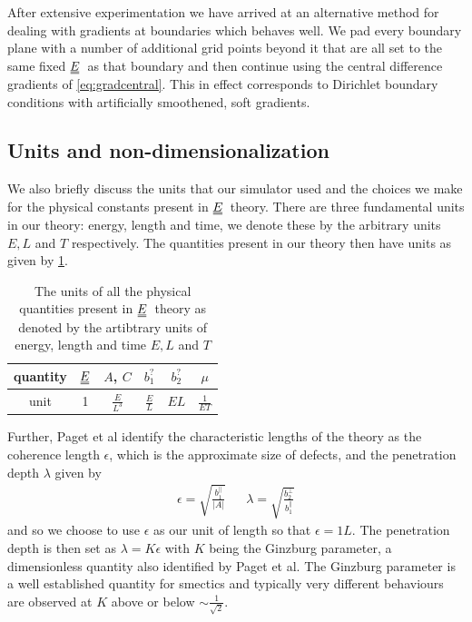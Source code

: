\documentclass[12pt]{article}
\newcommand{\duf}[2]{\stackunder[0.5pt]{\stackunder[0.8pt]{\stackunder[1pt]{\ensuremath{#1}}{\rule{\widthof{\ensuremath{#2}}*\real{0.9}}{.1ex}}}{\rule{\widthof{\ensuremath{#2}}*\real{0.9}}{.1ex}}}{}}
\newcommand{\du}[1]{\duf{#1}{#1}}
\newcommand{\EE}{\ensuremath{\du{E}}}
\begin{document}
        After extensive experimentation we have arrived at an alternative method for dealing with gradients at boundaries which behaves well.
        We pad every boundary plane with a number of additional grid points beyond it that are all set to the same fixed \EE\ as that boundary and then continue using the central difference gradients of \cref{eq:gradcentral}.
        This in effect corresponds to Dirichlet boundary conditions with artificially smoothened, soft gradients.

    \subsection{Units and non-dimensionalization}
        We also briefly discuss the units that our simulator used and the choices we make for the physical constants present in \EE\ theory.
        There are three fundamental units in our theory: energy, length and time, we denote these by the arbitrary units $\si{E},\si{L}$ and $\si{T}$ respectively.
        The quantities present in our theory then have units as given by \cref{tab:units}.
        \begin{table}[H]
            \begin{center}
                \renewcommand{\arraystretch}{1.5}
                \begin{tabular}{c | c | c | c | c | c }
                    quantity & \EE & $A$, $C$ & $b_1^?$ & $b_2^?$ & $\mu$ \\
                    \hline
                    unit & 1 & $\frac{\si{E}}{\si{L}^3}$ & $\frac{\si{E}}{\si{L}}$ & $\si{E} \si{L}$ & $\frac{1}{\si{E} \si{T}}$ \\
                \end{tabular}
            \end{center} 
            \caption{The units of all the physical quantities present in \EE\ theory as denoted by the artibtrary units of energy, length and time $\si{E}, \si{L}$ and $\si{T}$}\label{tab:units}
        \end{table}

        Further, Paget et al identify the characteristic lengths of the theory as the coherence length $\epsilon$, which is the approximate size of defects, and the penetration depth $\lambda$ given by
        \begin{align}
            \epsilon = \sqrt{\frac{b_1^\parallel}{|A|}} && \lambda = \sqrt{\frac{b_2^\perp}{b_1^\parallel}}
        \end{align}
        and so we choose to use $\epsilon$ as our unit of length so that $\epsilon = 1\si{L}$.
        The penetration depth is then set as $\lambda = K \epsilon$ with $K$ being the Ginzburg parameter, a dimensionless quantity also identified by Paget et al.
        The Ginzburg parameter is a well established quantity for smectics and typically very different behaviours are observed at $K$ above or below ${\sim}\frac{1}{\sqrt{2}}$.
\end{document}

